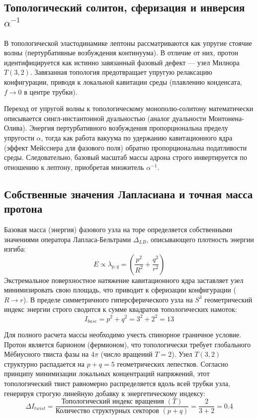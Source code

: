 \documentclass[12pt,a4paper]{article}
\begin{document}
	\subsection{Топологический солитон, сферизация и инверсия $\alpha^{-1}$}
	В топологической эластодинамике лептоны рассматриваются как упругие стоячие волны (пертурбативные возбуждения континуума). В отличие от них, протон идентифицируется как истинно завязанный фазовый дефект — узел Милнора $T(3,2)$. Завязанная топология предотвращает упругую релаксацию конфигурации, приводя к локальной кавитации среды (плавлению конденсата, $f \to 0$ в центре трубки). 
	
	Переход от упругой волны к топологическому монополю-солитону математически описывается сингл-инстантонной дуальностью (аналог дуальности Монтонена-Олива). Энергия пертурбативного возбуждения пропорциональна пределу упругости $\alpha$, тогда как работа вакуума по удержанию кавитационного ядра (эффект Мейсснера для фазового поля) обратно пропорциональна податливости среды. Следовательно, базовый масштаб массы адрона строго инвертируется по отношению к лептону, приобретая множитель $\alpha^{-1}$.
	
	\subsection{Собственные значения Лапласиана и точная масса протона}
	Базовая масса (энергия) фазового узла на торе определяется собственными значениями оператора Лапласа-Бельтрами $\Delta_{LB}$, описывающего плотность энергии изгиба:
	\begin{equation}
		E \propto \lambda_{p,q} = \left( \frac{p^2}{R^2} + \frac{q^2}{r^2} \right)
	\end{equation}
	Экстремальное поверхностное натяжение кавитационного ядра заставляет узел минимизировать свою площадь, что приводит к сферизации конфигурации ($R \to r$). В пределе симметричного гиперсферического узла на $S^3$ геометрический индекс энергии строго сводится к сумме квадратов топологических намоток: 
	\begin{equation}
		I_{base} = p^2 + q^2 = 3^2 + 2^2 = 13
	\end{equation}
	
	Для полного расчета массы необходимо учесть спинорное граничное условие. Протон является барионом (фермионом), что топологически требует глобального Мёбиусного твиста фазы на $4\pi$ (число вращений $T=2$). Узел $T(3,2)$ структурно распадается на $p+q = 5$ геометрических лепестков. Согласно принципу минимизации локальных концентраций напряжений, этот топологический твист равномерно распределяется вдоль всей трубки узла, генерируя строгую линейную добавку к энергетическому индексу:
	\begin{equation}
		\Delta I_{twist} = \frac{\text{Топологический индекс вращения } (T)}{\text{Количество структурных секторов } (p+q)} = \frac{2}{3+2} = \mathbf{0.4}
	\end{equation}
	
\end{document}
